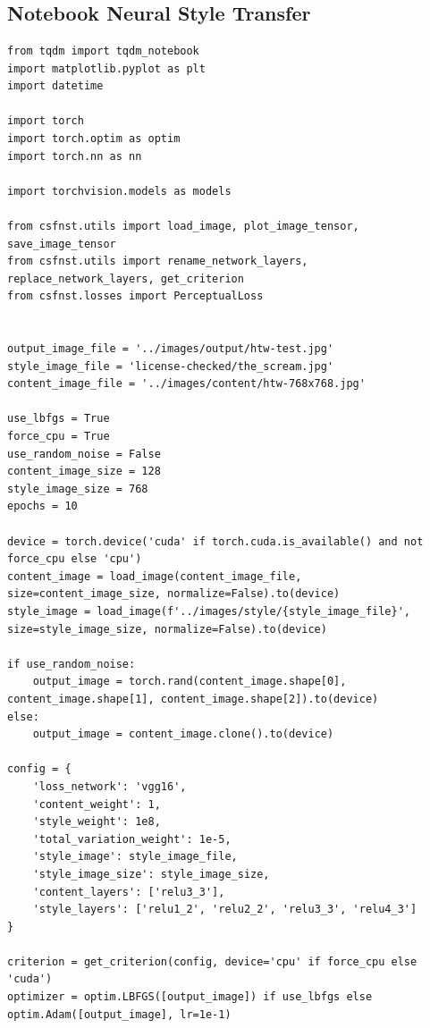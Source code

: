\appendix
\chapter{}

\section{Notebook Neural Style Transfer}
\label{sec:nootebook_neural_style_transfer}
\begin{longlisting}
\begin{verbatim}
from tqdm import tqdm_notebook
import matplotlib.pyplot as plt
import datetime

import torch
import torch.optim as optim
import torch.nn as nn

import torchvision.models as models

from csfnst.utils import load_image, plot_image_tensor, save_image_tensor
from csfnst.utils import rename_network_layers, replace_network_layers, get_criterion
from csfnst.losses import PerceptualLoss


output_image_file = '../images/output/htw-test.jpg'
style_image_file = 'license-checked/the_scream.jpg'
content_image_file = '../images/content/htw-768x768.jpg'

use_lbfgs = True
force_cpu = True
use_random_noise = False
content_image_size = 128
style_image_size = 768
epochs = 10

device = torch.device('cuda' if torch.cuda.is_available() and not force_cpu else 'cpu')
content_image = load_image(content_image_file, size=content_image_size, normalize=False).to(device)
style_image = load_image(f'../images/style/{style_image_file}', size=style_image_size, normalize=False).to(device)

if use_random_noise:
    output_image = torch.rand(content_image.shape[0], content_image.shape[1], content_image.shape[2]).to(device)
else:
    output_image = content_image.clone().to(device)

config = {
    'loss_network': 'vgg16',
    'content_weight': 1,
    'style_weight': 1e8,
    'total_variation_weight': 1e-5,
    'style_image': style_image_file,
    'style_image_size': style_image_size,
    'content_layers': ['relu3_3'],
    'style_layers': ['relu1_2', 'relu2_2', 'relu3_3', 'relu4_3']
}

criterion = get_criterion(config, device='cpu' if force_cpu else 'cuda')
optimizer = optim.LBFGS([output_image]) if use_lbfgs else optim.Adam([output_image], lr=1e-1)



\end{verbatim}
\end{longlisting}
